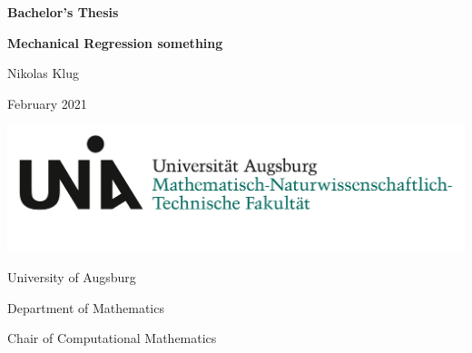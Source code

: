 \begin{titlepage}
	\centering
	
	\large{\textbf{Bachelor's Thesis}}
	\vspace{0.4cm}
	
	\huge{\textbf{Mechanical Regression something}}\par
	
	\vspace{1cm}
	\Large{Nikolas Klug}
	
	\vspace{1cm}
	\Large{February 2021}
	
	\vspace{\fill}
	\includegraphics[scale=0.5]{figures/Uni_Aug_Logo_MNTF_RGB.png}
	\vspace{5mm}
	
	University of Augsburg
	
	Department of Mathematics
	
	Chair of Computational Mathematics
\end{titlepage}

\normalfont
\restoregeometry
\pagebreak

